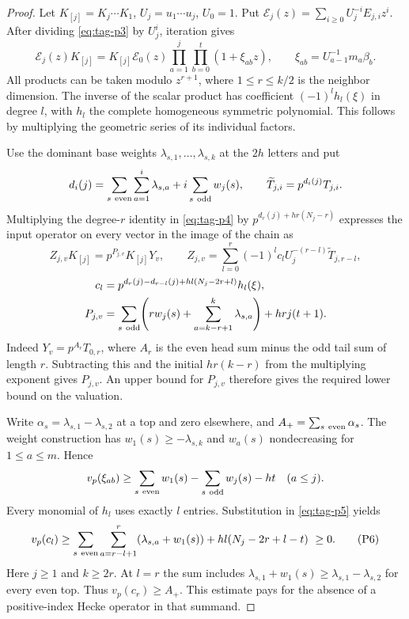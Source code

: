 \begin{proof}

Let \(K_{[j]}=K_j\cdots K_1\), \(U_j=u_1\cdots u_j\), \(U_0=1\).
Put \(\mathcal E_j(z)=\sum_{i\ge0}U_j^{-i}E_{j,i}z^i\).
After dividing \eqref{eq:tag-p3} by \(U_j^i\), iteration gives
\[
 \mathcal E_j(z)K_{[j]}=
 K_{[j]}\mathcal E_0(z)
 \prod_{a=1}^j\prod_{b=0}^t(1+\xi_{ab}z),\qquad
 \xi_{ab}=U_{a-1}^{-1}m_a\beta_b .
 \tag{P4}\label{eq:tag-p4}
\]
All products can be taken modulo \(z^{r+1}\), where \(1\le r\le k/2\)
is the neighbor dimension. The inverse of the scalar product has
coefficient \((-1)^l h_l(\xi)\) in degree \(l\), with \(h_l\)
the complete homogeneous symmetric polynomial. This follows by
multiplying the geometric series of its individual factors.


Use the dominant base weights \(\lambda_{s,1},\ldots,\lambda_{s,k}\)
at the \(2h\) letters and put
\[
 d_i(j)=\sum_{s\ {\rm even}}\sum_{a=1}^i\lambda_{s,a}
             +i\sum_{s\ {\rm odd}}w_j(s),\qquad
 \widetilde T_{j,i}=p^{d_i(j)}T_{j,i}.
\]
Multiplying the degree-\(r\) identity in \eqref{eq:tag-p4} by
\(p^{d_r(j)+hr(N_j-r)}\) expresses the input operator on
every vector in the image of the chain as
\[
 Z_{j,v}K_{[j]}=p^{P_{j,v}}K_{[j]}Y_v,\qquad
 Z_{j,v}=\sum_{l=0}^r(-1)^l c_l U_j^{-(r-l)}\widetilde T_{j,r-l},
 \tag{P5}\label{eq:tag-p5}
\]
\[
 \begin{split}
 c_l&=p^{d_r(j)-d_{r-l}(j)+hl(N_j-2r+l)}h_l(\xi),\\
 P_{j,v}&=\sum_{s\ {\rm odd}}\!
      \left(rw_j(s)+\sum_{a=k-r+1}^k\lambda_{s,a}\right)
                +hrj(t+1).
 \end{split}
\]
Indeed \(Y_v=p^{A_r}T_{0,r}\), where \(A_r\) is the even head
sum minus the odd tail sum of length \(r\). Subtracting this
and the initial \(hr(k-r)\) from the multiplying exponent gives
\(P_{j,v}\). An upper bound for \(P_{j,v}\) therefore gives the required lower bound on the valuation.


Write \(\alpha_s=\lambda_{s,1}-\lambda_{s,2}\) at a top and
zero elsewhere, and \(A_+=\sum_{s\ {\rm even}}\alpha_s\).
The weight construction has \(w_1(s)\ge-\lambda_{s,k}\)
and \(w_a(s)\) nondecreasing for \(1\le a\le m\). Hence
\[
 v_p(\xi_{ab})\ge \sum_{s\ {\rm even}}w_1(s)
                   -\sum_{s\ {\rm odd}}w_j(s)-ht\quad(a\le j).
\]
Every monomial of \(h_l\) uses exactly \(l\) entries. Substitution
in \eqref{eq:tag-p5} yields
\[
 v_p(c_l)\ge
 \sum_{s\ {\rm even}}\sum_{a=r-l+1}^{r}
                   (\lambda_{s,a}+w_1(s))
             +hl(N_j-2r+l-t)\ \ge0 .
 \tag{P6}\label{eq:tag-p6}
\]
Here \(j\ge1\) and \(k\ge2r\). At \(l=r\) the sum includes
\(\lambda_{s,1}+w_1(s)\ge\lambda_{s,1}-\lambda_{s,2}\)
for every even top. Thus \(v_p(c_r)\ge A_+\).
This estimate pays for the absence of a positive-index Hecke
operator in that summand.

\end{proof}

